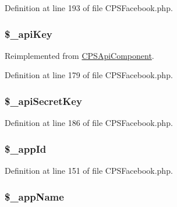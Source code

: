 Definition at line 193 of file CPSFacebook.php.

\hypertarget{classCPSFacebook_a30d859488ed1921f08a7e8191363d9a4}{
\subsubsection[{\$\_\-apiKey}]{\setlength{\rightskip}{0pt plus 5cm}\$\_\-apiKey}}
\label{classCPSFacebook_a30d859488ed1921f08a7e8191363d9a4}


Reimplemented from \hyperlink{classCPSApiComponent_a30d859488ed1921f08a7e8191363d9a4}{CPSApiComponent}.



Definition at line 179 of file CPSFacebook.php.

\hypertarget{classCPSFacebook_ae5bcbc03d954a2feca80ddd77054501d}{
\subsubsection[{\$\_\-apiSecretKey}]{\setlength{\rightskip}{0pt plus 5cm}\$\_\-apiSecretKey}}
\label{classCPSFacebook_ae5bcbc03d954a2feca80ddd77054501d}


Definition at line 186 of file CPSFacebook.php.

\hypertarget{classCPSFacebook_a26f5b0452f151ceda4f18979a5eb1058}{
\subsubsection[{\$\_\-appId}]{\setlength{\rightskip}{0pt plus 5cm}\$\_\-appId}}
\label{classCPSFacebook_a26f5b0452f151ceda4f18979a5eb1058}


Definition at line 151 of file CPSFacebook.php.

\hypertarget{classCPSFacebook_ab1025f24b9ab01061327e23b10552116}{
\subsubsection[{\$\_\-appName}]{\setlength{\rightskip}{0pt plus 5cm}\$\_\-appName}}
\label{classCPSFacebook_ab1025f24b9ab01061327e23b10552116}


